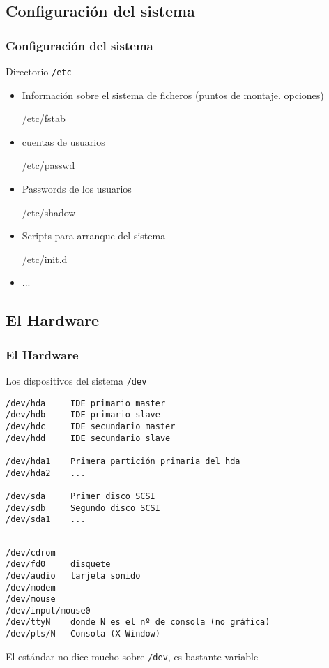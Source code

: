 \documentclass[ucs]{beamer}
\begin{document}
\subsection{Configuración del sistema}        
\begin{frame}[fragile]
\frametitle{Configuración del sistema}        

Directorio \verb|/etc|
\begin{itemize}

\item  

Información sobre el sistema de ficheros (puntos de montaje, opciones)

/etc/fstab
\item  
cuentas de usuarios

/etc/passwd
\item  
Passwords de los usuarios

/etc/shadow
\item  
Scripts para arranque del sistema

/etc/init.d
\item  
...
\end{itemize}
\end{frame}


\subsection{El Hardware}

\begin{frame}[fragile]
\frametitle{El Hardware}

Los dispositivos del sistema
\verb|/dev|
\begin{verbatim}
/dev/hda     IDE primario master 
/dev/hdb     IDE primario slave
/dev/hdc     IDE secundario master 
/dev/hdd     IDE secundario slave 

/dev/hda1    Primera partición primaria del hda
/dev/hda2    ...

/dev/sda     Primer disco SCSI
/dev/sdb     Segundo disco SCSI
/dev/sda1    ...


\end{verbatim}
\end{frame}
\begin{frame}[fragile]

\begin{verbatim}
/dev/cdrom
/dev/fd0     disquete 
/dev/audio   tarjeta sonido
/dev/modem
/dev/mouse
/dev/input/mouse0
/dev/ttyN    donde N es el nº de consola (no gráfica)
/dev/pts/N   Consola (X Window)

\end{verbatim}
El estándar no dice mucho sobre \verb|/dev|, es bastante variable

\end{frame}
\end{document}
